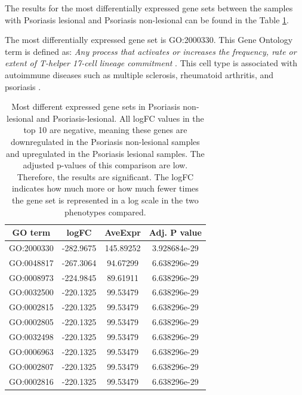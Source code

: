 \documentclass[aps,prb,twocolumn,superscriptaddress,floatfix,longbibliography]{revtex4-2}
\newif\ifptitle
\newif\ifpnumber
\newcounter{para}
\newcommand\ptitle[1]{\par\refstepcounter{para}
{\ifpnumber{\noindent\textcolor{lightgray}{\textbf{\thepara}}\indent}\fi}
{\ifptitle{\textbf{[{#1}]}}\fi}}
\begin{document}
\ptitle{Psoriasis non-lesional vs psoriasis lesional} The results for the most differentially expressed gene sets between the samples with Psoriasis
lesional and Psoriasis non-lesional can be found in the Table \ref{tab:psolvspsonl}.

The most differentially expressed gene set is GO:2000330. This Gene Ontology term is defined as: \textit{Any process that activates or increases the frequency, rate or extent of T-helper 17-cell lineage commitment} \cite{go:2000330}. This cell type is associated with autoimmune diseases such as multiple sclerosis, rheumatoid arthritis, and psoriasis \cite{wiki:Th17}.

\begin{table}[H]
\centering
\caption{Most different expressed gene sets in Psoriasis non-lesional and Psoriasis-lesional. All logFC values in the top 10 are negative, meaning these genes are downregulated in the Psoriasis non-lesional samples and upregulated in the Psoriasis lesional samples. The adjusted p-values of this comparison are low. Therefore, the results are significant. The logFC indicates how much more or how much fewer times the gene set is represented in a log scale in the two phenotypes compared.}
\begin{tabular}{ | c @{\hspace{0.3cm}} c @{\hspace{0.3cm}} c @{\hspace{0.3cm}} c | }
    \hline
    GO term & logFC & AveExpr & Adj. P value  \\
    \hline
    \hline
    GO:2000330 & -282.9675 & 145.89252 & 3.928684e-29 \\
    GO:0048817 & -267.3064 & 94.67299 & 6.638296e-29 \\
    GO:0008973 & -224.9845 & 89.61911 & 6.638296e-29 \\
    GO:0032500 & -220.1325 & 99.53479 & 6.638296e-29 \\
    GO:0002815 & -220.1325 & 99.53479 & 6.638296e-29 \\
    GO:0002805 & -220.1325 & 99.53479 & 6.638296e-29 \\
    GO:0032498 & -220.1325 & 99.53479 & 6.638296e-29 \\
    GO:0006963 & -220.1325 & 99.53479 & 6.638296e-29 \\
    GO:0002807 & -220.1325 & 99.53479 & 6.638296e-29 \\
    GO:0002816 & -220.1325 & 99.53479 & 6.638296e-29 \\
    \hline
\end{tabular}
\label{tab:psolvspsonl}
\end{table}
\end{document}
